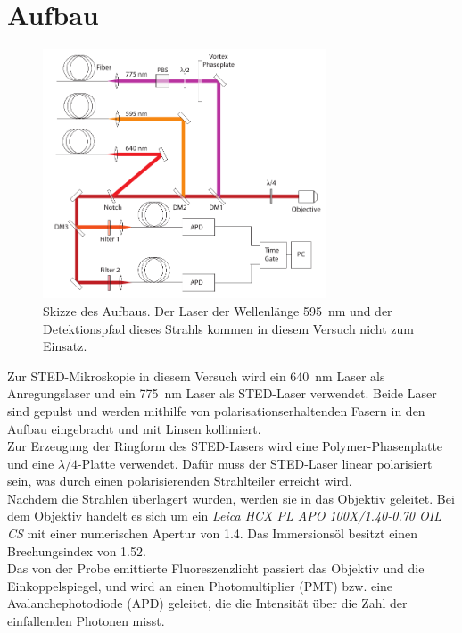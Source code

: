 \section{Aufbau}
\begin{figure}
	\centering
	\includegraphics[width=0.75\textwidth]{plots/aufbau.png}
	\caption{Skizze des Aufbaus. Der Laser der Wellenlänge 595~nm und der Detektionspfad dieses Strahls kommen in diesem Versuch nicht zum Einsatz.}
\end{figure}
Zur STED-Mikroskopie in diesem Versuch wird ein 640~nm Laser als Anregungslaser und ein 775~nm Laser als STED-Laser verwendet.
Beide Laser sind gepulst und werden mithilfe von polarisationserhaltenden Fasern in den Aufbau eingebracht und mit Linsen kollimiert.
\\
Zur Erzeugung der Ringform des STED-Lasers wird eine Polymer-Phasenplatte und eine $\lambda/4$-Platte verwendet.
Dafür muss der STED-Laser linear polarisiert sein, was durch einen polarisierenden Strahlteiler erreicht wird.
\\
Nachdem die Strahlen überlagert wurden, werden sie in das Objektiv geleitet.
Bei dem Objektiv handelt es sich um ein \emph{Leica HCX PL APO 100X/1.40-0.70 OIL CS} mit einer numerischen Apertur von 1.4. 
Das Immersionsöl besitzt einen Brechungsindex von 1.52.
\\
Das von der Probe emittierte Fluoreszenzlicht passiert das Objektiv und die Einkoppelspiegel, und wird an einen Photomultiplier (PMT) bzw. eine Avalanchephotodiode (APD) geleitet, die die Intensität über die Zahl der einfallenden Photonen misst.
